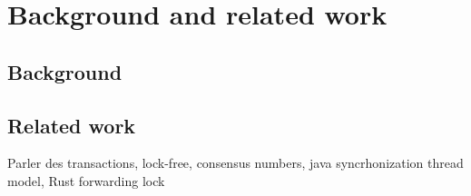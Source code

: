 \section{Background and related work}
\label{background}

\subsection{Background}

\subsection{Related work}

Parler des transactions, lock-free, consensus numbers, java syncrhonization thread model, Rust forwarding lock 
